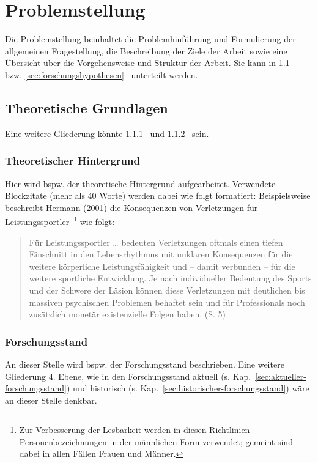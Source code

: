 \chapter{Problemstellung}
Die Problemstellung beinhaltet die Problemhinführung und Formulierung der allgemeinen Fragestellung, die Beschreibung der Ziele der Arbeit sowie eine Übersicht über die Vorgehensweise und Struktur der Arbeit. Sie kann in \ref{sec:theoretische-grundlagen}~ bzw. \ref{sec:forschungshypothesen}~ unterteilt werden.
\section{Theoretische Grundlagen}\label{sec:theoretische-grundlagen}
Eine weitere Gliederung könnte \ref{sec:theoretischer-hintergrund}~ und \ref{sec:forschungsstand}~ sein.
\subsection{Theoretischer Hintergrund}\label{sec:theoretischer-hintergrund}
Hier wird bspw. der theoretische Hintergrund aufgearbeitet. Verwendete Blockzitate (mehr als 40 Worte) werden dabei wie folgt formatiert:
Beispielsweise beschreibt Hermann (2001) die Konsequenzen von Verletzungen für Leistungssportler~\footnote{Zur Verbesserung der Lesbarkeit werden in diesen Richtlinien Personenbezeichnungen in der männlichen Form verwendet; gemeint sind dabei in allen Fällen Frauen und Männer.} wie folgt:
\begin{quotation}
	Für Leistungssportler … bedeuten Verletzungen oftmals einen tiefen Einschnitt in den Lebensrhythmus mit unklaren Konsequenzen für die weitere körperliche Leistungsfähigkeit und – damit verbunden – für die weitere sportliche Entwicklung. Je nach individueller Bedeutung des Sports und der Schwere der Läsion können diese Verletzungen mit deutlichen bis massiven psychischen Problemen behaftet sein und für Professionals noch zusätzlich monetär existenzielle Folgen haben. (S. 5)
\end{quotation}


\subsection{Forschungsstand}\label{sec:forschungsstand}
An dieser Stelle wird bspw. der Forschungsstand beschrieben. Eine weitere Gliederung 4. Ebene, wie in den Forschungsstand aktuell (s. Kap.~\ref{sec:aktueller-forschungsstand}) und historisch (s. Kap.~\ref{sec:historischer-forschungsstand}) wäre an dieser Stelle denkbar.
